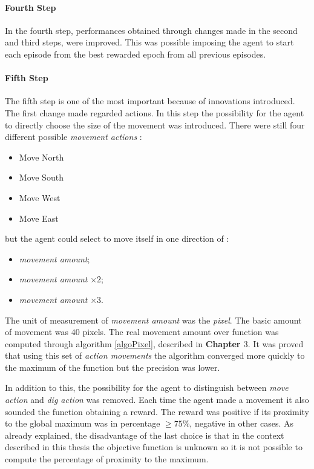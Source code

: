 \paragraph{Fourth Step} In the fourth step, performances obtained through changes made in the second and third steps, were improved. This was possible imposing the agent to start each episode from the best rewarded epoch from all previous episodes.

\paragraph{Fifth Step} The fifth step is one of the most important because of innovations introduced. The first change made regarded actions. In this step the possibility for the agent to directly choose the size of the movement was introduced. There were still four different possible \textit{movement actions} :

\begin{itemize}
	\item Move North
	\item Move South
	\item Move West
	\item Move East
\end{itemize}

but the agent could select to move itself in one direction of :

\begin{itemize}
	\item \textit{movement amount};
	\item \textit{movement amount} $\times 2$;
	\item \textit{movement amount} $\times 3$.
\end{itemize}

The unit of measurement of \textit{movement amount} was the \textit{pixel}. The basic amount of movement was $40$ pixels. The real movement amount over function was computed through algorithm \ref{algoPixel}, described in \textbf{Chapter $3$}. It was proved that using this set of \textit{action movements} the algorithm converged more quickly to the maximum of the function but the precision was lower. 

In addition to this, the possibility for the agent to distinguish between \textit{move action} and \textit{dig action} was removed. Each time the agent made a movement it also sounded the function obtaining a reward. The reward was positive if its proximity to the global maximum was in percentage $\ge 75\%$, negative in other cases. As already explained, the disadvantage of the last choice is that in the context described in this thesis the objective function is unknown so it is not possible to compute the percentage of proximity to the maximum.


